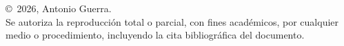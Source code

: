 \vspace*{\fill}

\noindent\copyright\ 2026, Antonio Guerra.\\[0.4cm]

\noindent Se autoriza la reproducción total o parcial, con fines académicos, por cualquier medio o procedimiento, incluyendo la cita bibliográfica del documento.

\clearpage
